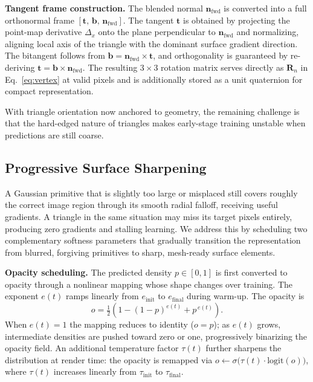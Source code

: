 \documentclass{llmxive}
\providecommand{\boldstart}[1]{\vspace{0.1in}\noindent\textbf{#1}}
\begin{document}
\boldstart{Tangent frame construction.}
The blended normal $\mathbf{n}_{\mathrm{fwd}}$ is converted into a full orthonormal frame $[\mathbf{t},\, \mathbf{b},\, \mathbf{n}_{\mathrm{fwd}}]$. The tangent $\mathbf{t}$ is obtained by projecting the point-map derivative $\Delta_x$ onto the plane perpendicular to $\mathbf{n}_{\mathrm{fwd}}$ and normalizing, aligning local axis of the triangle with the dominant surface gradient direction. The bitangent follows from $\mathbf{b} = \mathbf{n}_{\mathrm{fwd}} \times \mathbf{t}$, and orthogonality is guaranteed by re-deriving $\mathbf{t} = \mathbf{b} \times \mathbf{n}_{\mathrm{fwd}}$. The resulting $3\!\times\!3$ rotation matrix serves directly as $\mathbf{R}_n$ in Eq.~\eqref{eq:vertex} at valid pixels and is additionally stored as a unit quaternion for compact representation. 

With triangle orientation now anchored to geometry, the remaining challenge is that the hard-edged nature of triangles makes early-stage training unstable when predictions are still coarse.

\subsection{Progressive Surface Sharpening}
\label{sec:progressive}

A Gaussian primitive that is slightly too large or misplaced still covers roughly the correct image region through its smooth radial falloff, receiving useful gradients. A triangle in the same situation may miss its target pixels entirely, producing zero gradients and stalling learning. We address this by scheduling two complementary softness parameters that gradually transition the representation from blurred, forgiving primitives to sharp, mesh-ready surface elements.

\boldstart{Opacity scheduling.}
The predicted density $p\!\in\![0,1]$ is first converted to opacity through a nonlinear mapping whose shape changes over training. The exponent $e(t)$ ramps linearly from $e_{\mathrm{init}}$ to $e_{\mathrm{final}}$ during warm-up. The opacity is
\begin{equation}
    o = \tfrac{1}{2}\!\left(1 - (1-p)^{e(t)} + p^{\,e(t)}\right).
    \label{eq:opacity}
\end{equation}
When $e(t)\!=\!1$ the mapping reduces to identity ($o\!=\!p$); as $e(t)$ grows, intermediate densities are pushed toward zero or one, progressively binarizing the opacity field. An additional temperature factor $\tau(t)$ further sharpens the distribution at render time: the opacity is remapped via $o \leftarrow \sigma\!\bigl(\tau(t)\cdot\mathrm{logit}(o)\bigr)$, where $\tau(t)$ increases linearly from $\tau_{\mathrm{init}}$ to $\tau_{\mathrm{final}}$.
\end{document}
